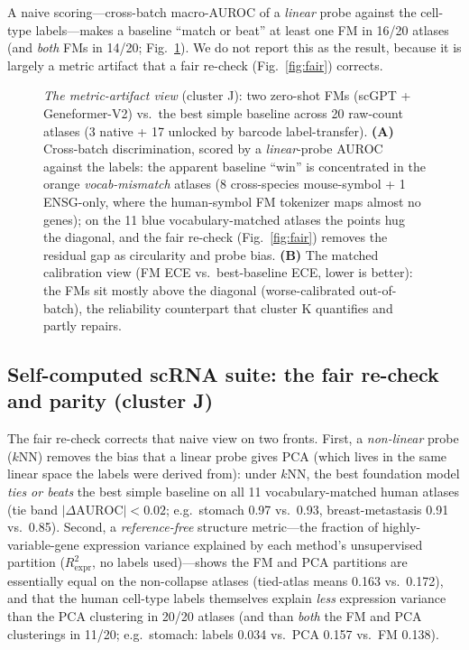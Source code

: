 \documentclass[fleqn,10pt,lineno]{wlpeerj}  %
\newcommand{\fitfig}[1]{\resizebox{\ifdim\width>\linewidth\linewidth\else\width\fi}{!}{#1}}
\begin{document}
A naive scoring---cross-batch macro-AUROC of a \emph{linear} probe against the cell-type labels---makes a baseline ``match or beat'' at least one FM in 16/20 atlases (and \emph{both} FMs in 14/20; Fig.~\ref{fig:fmvsbase}). We do not report this as the result, because it is largely a metric artifact that a fair re-check (Fig.~\ref{fig:fair}) corrects.

\begin{figure}[htb]\centering\fitfig{}
\caption{\emph{The metric-artifact view} (cluster J): two zero-shot FMs (scGPT + Geneformer-V2) vs.\ the best simple baseline across 20 raw-count atlases (3 native + 17 unlocked by barcode label-transfer). \textbf{(A)} Cross-batch discrimination, scored by a \emph{linear}-probe AUROC against the labels: the apparent baseline ``win'' is concentrated in the orange \emph{vocab-mismatch} atlases (8 cross-species mouse-symbol + 1 ENSG-only, where the human-symbol FM tokenizer maps almost no genes); on the 11 blue vocabulary-matched atlases the points hug the diagonal, and the fair re-check (Fig.~\ref{fig:fair}) removes the residual gap as circularity and probe bias. \textbf{(B)} The matched calibration view (FM ECE vs.\ best-baseline ECE, lower is better): the FMs sit mostly above the diagonal (worse-calibrated out-of-batch), the reliability counterpart that cluster K quantifies and partly repairs.}\label{fig:fmvsbase}\end{figure}

\subsection{Self-computed scRNA suite: the fair re-check and parity (cluster J)}
The fair re-check corrects that naive view on two fronts. First, a \emph{non-linear} probe ($k$NN) removes the bias that a linear probe gives PCA (which lives in the same linear space the labels were derived from): under $k$NN, the best foundation model \emph{ties or beats} the best simple baseline on all 11 vocabulary-matched human atlases (tie band $|\Delta\mathrm{AUROC}|<0.02$; e.g.\ stomach 0.97 vs.\ 0.93, breast-metastasis 0.91 vs.\ 0.85). Second, a \emph{reference-free} structure metric---the fraction of highly-variable-gene expression variance explained by each method's unsupervised partition ($R^2_{\mathrm{expr}}$, no labels used)---shows the FM and PCA partitions are essentially equal on the non-collapse atlases (tied-atlas means 0.163 vs.\ 0.172), and that the human cell-type labels themselves explain \emph{less} expression variance than the PCA clustering in 20/20 atlases (and than \emph{both} the FM and PCA clusterings in 11/20; e.g.\ stomach: labels 0.034 vs.\ PCA 0.157 vs.\ FM 0.138).
\end{document}
